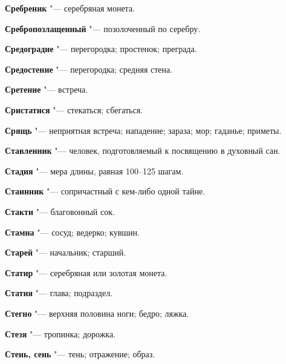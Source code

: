 \begin{mymulticols}{2}
\noindent\textbf{Сребреник} "--- серебряная монета. 




\noindent\textbf{Сребропозлащенный} "--- позолоченный по серебру. 




\noindent\textbf{Средоградие} "--- перегородка; простенок; преграда. 




\noindent\textbf{Средостение} "--- перегородка; средняя стена. 




\noindent\textbf{Сретение} "--- встреча. 




\noindent\textbf{Сристатися} "--- стекаться; сбегаться. 




\noindent\textbf{Срящь} "--- неприятная встреча; нападение; зараза; мор; гаданье; приметы. 




\noindent\textbf{Ставленник} "--- человек, подготовляемый к посвящению в духовный сан. 




\noindent\textbf{Стадия} "--- мера длины, равная 100--125 шагам. 




\noindent\textbf{Стаинник} "--- сопричастный с кем-либо одной тайне. 




\noindent\textbf{Стакти} "--- благовонный сок. 




\noindent\textbf{Стамна} "--- сосуд; ведерко; кувшин. 




\noindent\textbf{Старей} "--- начальник; старший. 




\noindent\textbf{Статир} "--- серебряная или золотая монета. 




\noindent\textbf{Статия} "--- глава; подраздел. 




\noindent\textbf{Стегно} "--- верхняя половина ноги; бедро; ляжка. 




\noindent\textbf{Стезя} "--- тропинка; дорожка. 




\noindent\textbf{Стень, сень} "--- тень; отражение; образ. 





\end{mymulticols}
